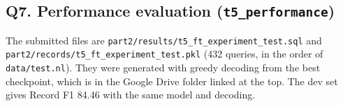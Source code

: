 \documentclass[11pt]{article}
\begin{document}
\subsection{Q7. Performance evaluation (\texttt{t5\_performance})}

The submitted files are \texttt{part2/results/t5\_ft\_experiment\_test.sql} and
\texttt{part2/records/t5\_ft\_experiment\_test.pkl} (432 queries, in the order of \texttt{data/test.nl}). They were
generated with greedy decoding from the best checkpoint, which is in the Google Drive folder linked at the top. The dev set gives
Record F1 84.46 with the same model and decoding.
\end{document}
